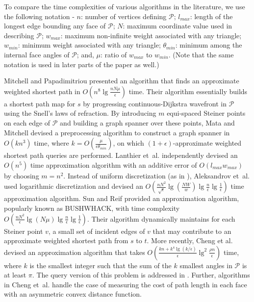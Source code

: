 \documentclass[11pt]{article}
\def\calP{\mathcal{P}}
\begin{document}
To compare the time complexities of various algorithms in the literature, we use the following notation -
$n$: number of vertices defining $\calP$; $l_{max}$: length of the longest edge bounding any face of $\calP$; $N$: maximum coordinate value used in describing $\calP$; $w_{max}$: maximum non-infinite weight associated with any triangle; $w_{min}$: minimum weight associated with any triangle; $\theta_{min}$: minimum among the internal face angles of $\calP$; and, $\mu$: ratio of $w_{max}$ to $w_{min}$.
(Note that the same notation is used in later parts of the paper as well.)

Mitchell and Papadimitriou \cite{journals/jacm/MitchellP91} presented an algorithm that finds an approximate weighted shortest path in $O(n^8 \lg{\frac{nN\mu}{\epsilon}})$ time.
Their algorithm essentially builds a shortest path map for $s$ by progressing continuous-Dijkstra wavefront in $\calP$ using the Snell's laws of refraction.
By introducing $m$ equi-spaced Steiner points on each edge of $\calP$ and building a graph spanner over these points, Mata and Mitchell \cite{conf/compgeom/MataM97} devised a preprocessing algorithm to construct a graph spanner in $O(kn^3)$ time, where $k = O(\frac{\mu}{\epsilon \theta_{min}})$, on which $(1+\epsilon)$-approximate weighted shortest path queries are performed.
Lanthier et~al. \cite{journals/algorithmica/LanthierMS01} independently devised an $O(n^5)$ time approximation algorithm with an additive error of $O(l_{max} w_{max})$ by choosing $m = n^2$.
Instead of uniform discretization (as in \cite{conf/compgeom/MataM97}), Aleksandrov et~al. \cite{conf/swat/AleksandrovLMS98,journals/jacm/AleksandrovMS05} used logarithmic discretization and devised an $O(\frac{nN^2}{\sqrt{\epsilon}}\lg(\frac{NW}{w})\lg{\frac{n}{\epsilon}}\lg{\frac{1}{\epsilon}})$ time approximation algorithm.
Sun and Reif \cite{journals/jal/SunR06} provided an approximation algorithm, popularly known as BUSHWHACK, with time complexity $O(\frac{nN^2}{\epsilon}\lg({N\mu})\lg{\frac{n}{\epsilon}}\lg{\frac{1}{\epsilon}})$.
Their algorithm dynamically maintains for each Steiner point $v$, a small set of incident edges of $v$ that may contribute to an approximate weighted shortest path from $s$ to $t$.
More recently, Cheng et al. \cite{conf/soda/ChengJV15} devised an approximation algorithm that takes $O(\frac{kn + k^4 \lg(k/\epsilon)}{\epsilon}\lg^2{\frac{\rho n}{\epsilon}})$ time, where $k$ is the smallest integer such that the sum of the $k$ smallest angles in $\calP$ is at least $\pi$.
The query version of this problem is addressed in \cite{conf/swat/AleksandrovLMS98,journals/jacm/AleksandrovMS05,journals/jal/SunR06,journals/jacm/MitchellP91,journals/siamcomp/ChengNVW10,journals/dcg/AleksandrovDGMNS10}.
Further, algorithms in Cheng et~al. \cite{journals/siamcomp/ChengNVW10} handle the case of measuring the cost of path length in each face with an asymmetric convex distance function. 
\end{document}
